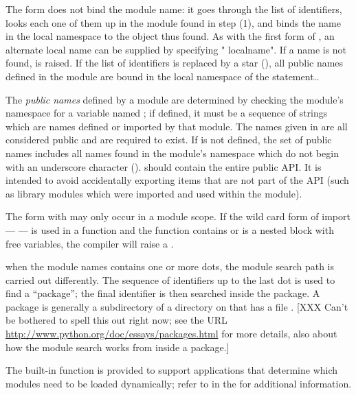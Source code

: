 The  form does not bind the module name: it goes through the
list of identifiers, looks each one of them up in the module found in step
(1), and binds the name in the local namespace to the object thus found. 
As with the first form of , an alternate local name can be
supplied by specifying " localname".  If a name is not found,
 is raised.  If the list of identifiers is replaced
by a star (\character{*}), all public names defined in the module are
bound in the local namespace of the  statement..

The \emph{public names} defined by a module are determined by checking
the module's namespace for a variable named ; if
defined, it must be a sequence of strings which are names defined or
imported by that module.  The names given in  are all
considered public and are required to exist.  If  is not
defined, the set of public names includes all names found in the
module's namespace which do not begin with an underscore character
(\character{_}).   should contain the entire public API.
It is intended to avoid accidentally exporting items that are not part
of the API (such as library modules which were imported and used within
the module).

The  form with \samp{*} may only occur in a module
scope.  If the wild card form of import ---  --- is
used in a function and the function contains or is a nested block with
free variables, the compiler will raise a .


when the module names contains one or more dots, the module search
path is carried out differently.  The sequence of identifiers up to
the last dot is used to find a ``package''; the final
identifier is then searched inside the package.  A package is
generally a subdirectory of a directory on  that has a
file .
%
[XXX Can't be bothered to spell this out right now; see the URL
\url{http://www.python.org/doc/essays/packages.html} for more details, also
about how the module search works from inside a package.]

The built-in function  is provided to support
applications that determine which modules need to be loaded
dynamically; refer to  in the
 for additional
information.

